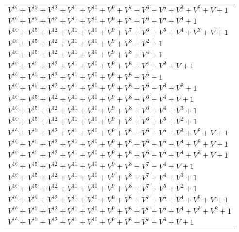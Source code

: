 \documentclass[12pt]{article}
\begin{document}
\begin{adjustwidth}{-4cm}{}
\begin{center}
\begin{longtable}{|l|}
$V^{16}  +V^{15}  +V^{12}  +V^{11}  +V^{10}  +V^{9}  +V^{7}  +V^{6}  +V^{5}  +V^{3}  +V^{2}  + V + 1$ \\
$V^{16}  +V^{15}  +V^{12}  +V^{11}  +V^{10}  +V^{9}  +V^{7}  +V^{6}  +V^{5}  +V^{4}  + 1$ \\
$V^{16}  +V^{15}  +V^{12}  +V^{11}  +V^{10}  +V^{9}  +V^{7}  +V^{6}  +V^{5}  +V^{4}  +V^{3}  + V + 1$ \\
$V^{16}  +V^{15}  +V^{12}  +V^{11}  +V^{10}  +V^{9}  +V^{8}  +V^{2}  + 1$ \\
$V^{16}  +V^{15}  +V^{12}  +V^{11}  +V^{10}  +V^{9}  +V^{8}  +V^{4}  + 1$ \\
$V^{16}  +V^{15}  +V^{12}  +V^{11}  +V^{10}  +V^{9}  +V^{8}  +V^{4}  +V^{2}  + V + 1$ \\
$V^{16}  +V^{15}  +V^{12}  +V^{11}  +V^{10}  +V^{9}  +V^{8}  +V^{5}  + 1$ \\
$V^{16}  +V^{15}  +V^{12}  +V^{11}  +V^{10}  +V^{9}  +V^{8}  +V^{6}  +V^{3}  +V^{2}  + 1$ \\
$V^{16}  +V^{15}  +V^{12}  +V^{11}  +V^{10}  +V^{9}  +V^{8}  +V^{6}  +V^{4}  + V + 1$ \\
$V^{16}  +V^{15}  +V^{12}  +V^{11}  +V^{10}  +V^{9}  +V^{8}  +V^{6}  +V^{4}  +V^{3}  + 1$ \\
$V^{16}  +V^{15}  +V^{12}  +V^{11}  +V^{10}  +V^{9}  +V^{8}  +V^{6}  +V^{5}  +V^{2}  + 1$ \\
$V^{16}  +V^{15}  +V^{12}  +V^{11}  +V^{10}  +V^{9}  +V^{8}  +V^{6}  +V^{5}  +V^{3}  +V^{2}  + V + 1$ \\
$V^{16}  +V^{15}  +V^{12}  +V^{11}  +V^{10}  +V^{9}  +V^{8}  +V^{6}  +V^{5}  +V^{4}  +V^{2}  + V + 1$ \\
$V^{16}  +V^{15}  +V^{12}  +V^{11}  +V^{10}  +V^{9}  +V^{8}  +V^{6}  +V^{5}  +V^{4}  +V^{3}  + V + 1$ \\
$V^{16}  +V^{15}  +V^{12}  +V^{11}  +V^{10}  +V^{9}  +V^{8}  +V^{7}  +V^{4}  + V + 1$ \\
$V^{16}  +V^{15}  +V^{12}  +V^{11}  +V^{10}  +V^{9}  +V^{8}  +V^{7}  +V^{4}  +V^{3}  + 1$ \\
$V^{16}  +V^{15}  +V^{12}  +V^{11}  +V^{10}  +V^{9}  +V^{8}  +V^{7}  +V^{5}  +V^{2}  + 1$ \\
$V^{16}  +V^{15}  +V^{12}  +V^{11}  +V^{10}  +V^{9}  +V^{8}  +V^{7}  +V^{5}  +V^{4}  +V^{2}  + V + 1$ \\
$V^{16}  +V^{15}  +V^{12}  +V^{11}  +V^{10}  +V^{9}  +V^{8}  +V^{7}  +V^{5}  +V^{4}  +V^{3}  +V^{2}  + 1$ \\
$V^{16}  +V^{15}  +V^{12}  +V^{11}  +V^{10}  +V^{9}  +V^{8}  +V^{7}  +V^{6}  + V + 1$ \\

\end{longtable}
\end{center}
\end{adjustwidth}
\end{document}
